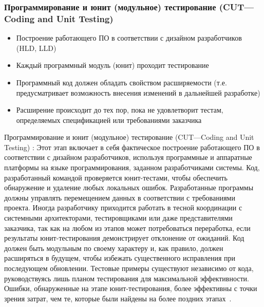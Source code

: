 \documentclass{../industrial-development}
\begin{document}
\begin{frame} \frametitle{Программирование и юнит (модульное) тестирование (CUT---Coding and Unit Testing)}
\begin{itemize}
\item Построение работающего ПО в соответствии с дизайном разработчиков (HLD, LLD)
\item Каждый программный модуль (юнит) проходит тестирование
\item Программный код должен обладать свойством расширяемости (т.е. предусматривает возможность внесения изменений в дальнейшей разработке)
\item Расширение происходит до тех пор, пока не удовлетворит тестам, определяемых спецификацией или требованиями заказчика 
\end{itemize}
\end{frame}
\lecturenotes
Программирование и юнит (модульное) тестирование (CUT---Coding and Unit Testing) :
Этот этап включает в себя фактическое построение работающего ПО в соответствии с дизайном разработчиков, используя программные и аппаратные платформы на языке программирования, заданном разработчиками системы. Код, разработанный командой проверяется юнит-тестами, чтобы обеспечить обнаружение и удаление любых локальных ошибок. Разработанные программы должны управлять перемещением данных в соответствии с требованиями проекта. Иногда разработчику приходится работать в тесной координации с системными архитекторами, тестировщиками или даже представителями заказчика, так как на любом из этапов может потребоваться переработка, если результаты юнит-тестирования демонстрирует отклонение от ожиданий. Код должен быть модульным по своему характеру и, как правило, должен расширяться в будущем, чтобы избежать существенного исправления при последующем обновлении. Тестовые примеры существуют независимо от кода,  руководствуясь лишь планом тестирования для максимальной эффективности. Ошибки, обнаруженные на этапе юнит-тестирования, более эффективны с точки зрения затрат, чем те, которые были найдены на более поздних этапах~\cite{SDLC}.
\end{document}
